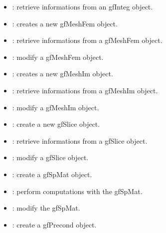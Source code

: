 \documentclass[a4paper,11pt,english]{sphinxmanual}
\begin{document}
\begin{itemize}
\item {} 
\sphinxAtStartPar
{} : retrieve informations from an gfInteg object.

\item {} 
\sphinxAtStartPar
{} : creates a new gfMeshFem object.

\item {} 
\sphinxAtStartPar
{} : retrieve informations from a gfMeshFem object.

\item {} 
\sphinxAtStartPar
{} : modify a gfMeshFem object.

\item {} 
\sphinxAtStartPar
{} : creates a new gfMeshIm object.

\item {} 
\sphinxAtStartPar
{} : retrieve informations from a gfMeshIm object.

\item {} 
\sphinxAtStartPar
{} : modify a gfMeshIm object.

\item {} 
\sphinxAtStartPar
{} : create a new gfSlice object.

\item {} 
\sphinxAtStartPar
{} : retrieve informations from a gfSlice object.

\item {} 
\sphinxAtStartPar
{} : modify a gfSlice object.

\item {} 
\sphinxAtStartPar
{} : create a gfSpMat object.

\item {} 
\sphinxAtStartPar
{} : perform computations with the gfSpMat.

\item {} 
\sphinxAtStartPar
{} : modify the gfSpMat.

\item {} 
\sphinxAtStartPar
{} : create a gfPrecond object.


\end{itemize}
\end{document}
